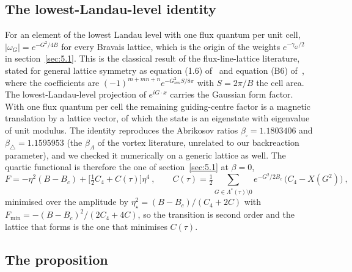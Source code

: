 \subsection{The lowest-Landau-level identity}
\label{app:probe-lll-identity}

For an element of the lowest
Landau level with one flux quantum per unit cell, $|\omega_G| = e^{-G^2/4B}$
for every Bravais lattice, which is the origin of the weights
$e^{-\gamma_G/2}$ in section~\ref{sec:5.1}. This is the classical result of
the flux-line-lattice literature, stated for general lattice symmetry as
equation (1.6) of~\cite{Brandt:1995rpp} and equation (B6)
of~\cite{Brandt:2003prb}, where the coefficients are
$(-1)^{m+mn+n}e^{-G_{mn}^2 S/8\pi}$ with $S = 2\pi/B$ the cell area. The
lowest-Landau-level projection of $e^{iG\cdot x}$ carries the Gaussian form
factor. With one flux quantum per cell the remaining guiding-centre factor
is a magnetic translation by a lattice vector, of which the state is an
eigenstate with eigenvalue of unit modulus. The identity reproduces the
Abrikosov ratios $\beta_\square = 1.1803406$ and
$\beta_\triangle = 1.1595953$ (the $\beta_A$ of the vortex literature,
unrelated to our backreaction parameter), and we checked it numerically on
a generic lattice as well. The quartic functional is therefore the one of section~\ref{sec:5.1} at
$\beta = 0$,
\begin{equation}
F = -\eta^2(B - B_c) + \Big[\tfrac12C_4 + C(\tau)\Big]\eta^4~, \qquad
C(\tau) = \tfrac12\sum_{G\in\Lambda^*(\tau)\setminus0} e^{-G^2/2B_c}\,\big(C_4 - X(G^2)\big)~,
\end{equation}
minimised over the amplitude by $\eta_\star^2 = (B - B_c)/(C_4 + 2C)$
with $F_{\min} = -(B - B_c)^2/(2C_4 + 4C)$, so the transition is second
order and the lattice that forms is the one that minimises $C(\tau)$.

\subsection{The proposition}
\label{app:probe-theorem}

